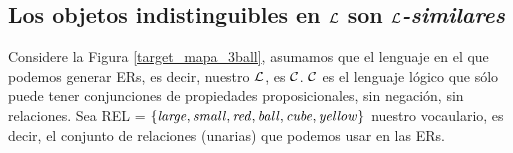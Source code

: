 \subsection{Los objetos indistinguibles en $\mathcal{L}$ son \emph{$\mathcal{L}$-similares}}
\label{sec:indistinguibles}

Considere la Figura \ref{target_mapa_3ball}, asumamos que el lenguaje en el que podemos generar ERs, es decir, nuestro $\mathcal{L}$, es $\mathcal{C}$. $\mathcal{C}$ es el lenguaje l\'ogico
que s\'olo puede tener conjunciones de propiedades proposicionales, 
sin negaci\'on, sin relaciones. Sea REL = $\{\mathit{large}, \mathit{small}, \mathit{red}, \mathit{ball}, \mathit{cube}, \mathit{yellow} \}$ nuestro vocaulario, es decir, el conjunto de relaciones (unarias) que podemos usar en las ERs.

